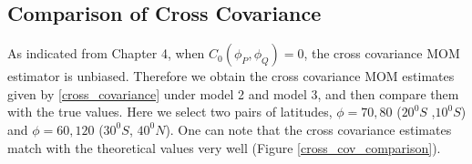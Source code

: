 \subsection{Comparison of Cross Covariance}

As indicated from Chapter 4, when $C_0(\phi_P, \phi_Q) = 0$, the cross covariance MOM estimator is unbiased. Therefore we obtain the cross covariance MOM estimates given by \eqref{cross_covariance} under model 2 and model 3, and then compare them with the true values. Here we select two pairs of latitudes, $\phi = 70, 80$ ($20^0S$ ,$10^0S$) and $\phi = 60, 120$ ($30^0S$, $40^0N$). One can note that the cross covariance estimates match with the theoretical values very well (Figure \ref{cross_cov_comparison}).


% 
% 

